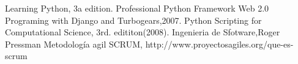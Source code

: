 \begin{thebibliography}{2007}
Learning Python, 3a edition.
Professional Python Framework Web 2.0 Programing with Django and Turbogears,2007.
Python Scripting for Computational Science, 3rd. edititon(2008). 
Ingenieria de Sfotware,Roger Pressman
Metodología agil SCRUM, http://www.proyectosagiles.org/que-es-scrum
\end{thebibliography}